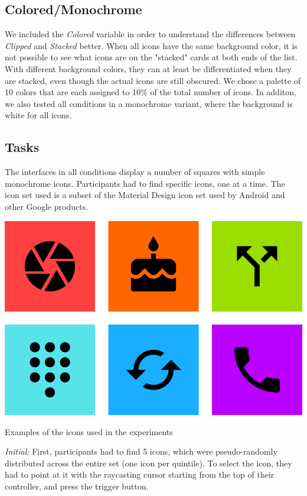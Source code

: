 \documentclass{tufte-book} %
\begin{document}
\subsection{Colored/Monochrome}

We included the \emph{Colored} variable in order to understand the differences between \emph{Clipped} and \emph{Stacked} better. When all icons have the same background color, it is not possible to see what icons are on the "stacked" cards at both ends of the list. With different background colors, they can at least be differentiated when they are stacked, even though the actual icons are still obscured. We chose a palette of 10 colors that are each assigned to 10\% of the total number of icons. In additon, we also tested all conditions in a monochrome variant, where the background is white for all icons.

\subsection{Tasks}
The interfaces in all conditions display a number of squares with simple monochrome icons. Participants had to find specific icons, one at a time. The icon set used is a subset of the Material Design icon set used by Android and other Google products.

\begin{marginfigure}
  \includegraphics[width=\linewidth]{material-icons.png}
  \caption{Examples of the icons used in the experiments}
  \label{fig:material-icons}
\end{marginfigure}

\emph{Initial:} First, participants had to find 5 icons, which were pseudo-randomly distributed across the entire set (one icon per quintile). To select the icon, they had to point at it with the raycasting cursor starting from the top of their controller, and press the trigger button.
\end{document}
